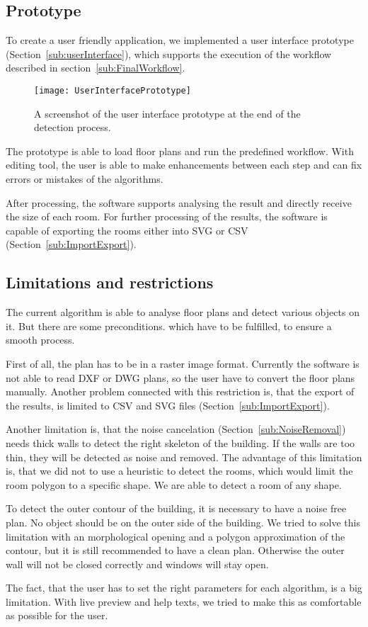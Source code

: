 \subsection{Prototype}
To create a user friendly application, we implemented a user interface prototype (Section~\ref{sub:userInterface}), which supports the execution of the workflow described in section~\ref{sub:FinalWorkflow}.

\begin{figure}[H]
	\centering
	\texttt{[image: UserInterfacePrototype]}
	\caption{A screenshot of the user interface prototype at the end of the detection process.}
	\label{fig:UserInterfacePrototype}
\end{figure}

The prototype is able to load floor plans and run the predefined workflow. With editing tool, the user is able to make enhancements between each step and can fix errors or mistakes of the algorithms.

After processing, the software supports analysing the result and directly receive the size of each room. For further processing of the results, the software is capable of exporting the rooms either into SVG or CSV (Section~\ref{sub:ImportExport}).

\subsection{Limitations and restrictions}
The current algorithm is able to analyse floor plans and detect various objects on it. But there are some preconditions. which have to be fulfilled, to ensure a smooth process.

First of all, the plan has to be in a raster image format. Currently the software is not able to read DXF or DWG plans, so the user have to convert the floor plans manually. Another problem connected with this restriction is, that the export of the results, is limited to CSV and SVG files (Section~\ref{sub:ImportExport}).

Another limitation is, that the noise cancelation (Section~\ref{sub:NoiseRemoval}) needs thick walls to detect the right skeleton of the building. If the walls are too thin, they will be detected as noise and removed. The advantage of this limitation is, that we did not to use a heuristic to detect the rooms, which would limit the room polygon to a specific shape. We are able to detect a room of any shape.

To detect the outer contour of the building, it is necessary to have a noise free plan. No object should be on the outer side of the building. We tried to solve this limitation with an morphological opening and a polygon approximation of the contour, but it is still recommended to have a clean plan. Otherwise the outer wall will not be closed correctly and windows will stay open.

The fact, that the user has to set the right parameters for each algorithm, is a big limitation. With live preview and help texts, we tried to make this as comfortable as possible for the user.

